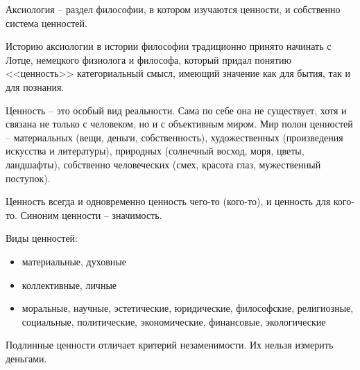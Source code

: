 
Аксиология -- раздел философии, в котором изучаются ценности, и собственно система ценностей.

Историю аксиологии в истории философии традиционно принято начинать с Лотце, немецкого физиолога и философа, который  придал понятию <<ценность>> категориальный смысл, имеющий значение как для бытия, так и для познания.

Ценность – это особый вид реальности. Сама по себе она не существует, хотя и связана не только с человеком, но и с объективным миром. Мир полон ценностей – материальных (вещи, деньги, собственность), художественных (произведения искусства и литературы), природных (солнечный восход, моря, цветы, ландшафты), собственно человеческих (смех, красота глаз, мужественный поступок).

Ценность всегда и одновременно ценность чего-то (кого-то), и ценность для кого-то. Синоним ценности -- значимость.

Виды ценностей:
\begin{itemize}
	\item материальные, духовные
\end{itemize}

\begin{itemize}
	\item коллективные, личные
\end{itemize}

\begin{itemize}
	\item моральные, научные, эстетические, юридические, философские, религиозные, социальные, политические, экономические, финансовые, экологические
\end{itemize}

Подлинные ценности отличает критерий незаменимости. Их нельзя измерить деньгами.
